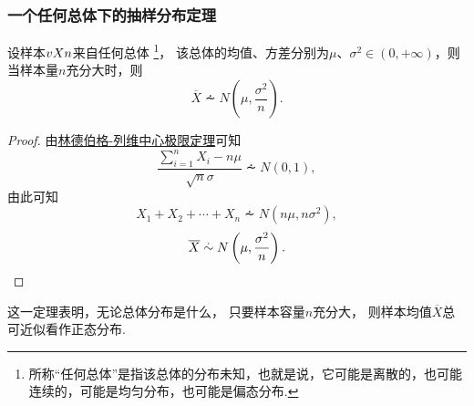\subsubsection{一个任何总体下的抽样分布定理}
\begin{theorem}
设样本\(v{X}{n}\)来自任何总体%
\footnote{所称“任何总体”是指该总体的分布未知，也就是说，它可能是离散的，也可能连续的，可能是均匀分布，也可能是偏态分布.}，%
该总体的均值、方差分别为\(\mu\)、\(\sigma^2\in(0,+\infty)\)，则当样本量\(n\)充分大时，则\begin{equation}
\overline{X} \dotsim N\left(\mu,\frac{\sigma^2}{n}\right).
\end{equation}
\begin{proof}
由\hyperref[theorem:极限定理.林德伯格-列维中心极限定理]{林德伯格-列维中心极限定理}可知\[
\frac{\sum\limits_{i=1}^n X_i - n\mu}{\sqrt{n} \sigma} \dotsim N(0,1),
\]由此可知\[
X_1+X_2+\dotsb+X_n \dotsim N(n\mu,n\sigma^2),
\]\[
\overline{X} \overset{.}{\sim} N\left(\mu,\frac{\sigma^2}{n}\right).
\qedhere
\]
\end{proof}
\end{theorem}
这一定理表明，无论总体分布是什么，%
只要样本容量\(n\)充分大，%
则样本均值\(\overline{X}\)总可近似看作正态分布.
